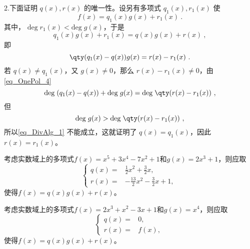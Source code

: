 2.下面证明 $q(x),r(x)$ 的唯一性。设另有多项式 $q_1(x),r_1(x)$ 使
\begin{equation}
f(x)=q_1(x)g(x)+r_1(x)~.
\end{equation}
其中， $\mathrm{deg}\;r_1(x)<\mathrm{deg}\;g(x)$，于是
\begin{equation}
q_1(x)g(x)+r_1(x)=q(x)g(x)+r(x)~,
\end{equation}
即
\begin{equation}
\qty(q_1(x)-q(x))g(x)=r(x)-r_1(x)~.
\end{equation}
若 $q(x)\neq q_1(x)$，又 $g(x)\neq 0$，那么 $r(x)-r_1(x)\neq 0$，由\autoref{eq_OnePol_4}~
\begin{equation}\label{eq_DivAlg_1}
\mathrm{deg}\;(q_1(x)-q(x))+\mathrm{deg}\;g(x)=\mathrm{deg}\;\qty(r(x)-r_1(x))~,
\end{equation}
但
\begin{equation}
\mathrm{deg}\;g(x)>\mathrm{deg}\;\qty(r(x)-r_1(x))~,
\end{equation}
所以\autoref{eq_DivAlg_1} 不能成立，这就证明了
$q(x)=q_1(x)$，因此 $r(x)=r_1(x)$。





\begin{example}{}
考虑实数域上的多项式$f(x)=x^5+3x^4-7x^2+1$和$g(x)=2x^3+1$，则应取
\begin{equation}
\left\{
\begin{aligned}
q(x) ={}& \frac{1}{2}x^2+\frac{3}{2}x , \\
r(x) ={}& -\frac{13}{2}x^2-\frac{3}{2}x+1 , 
\end{aligned}
\right. ~
\end{equation}
使得$f(x)=q(x)g(x)+r(x)$。

\end{example}



\begin{example}{}
考虑实数域上的多项式$f(x)=2x^3+x^2-3x+1$和$g(x)=x^4$，则应取
\begin{equation}
\left\{
\begin{aligned}
q(x) ={}& 0 , \\
r(x) ={}& f(x) , 
\end{aligned}
\right. ~
\end{equation}
使得$f(x)=q(x)g(x)+r(x)$。
\end{example}






